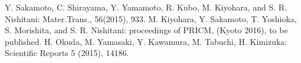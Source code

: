 \documentclass[a4j,twocolumn]{jsarticle}
\begin{document}
\begin{thebibliography}{9}
Y. Sakamoto, C. Shirayama, Y. Yamamoto, R. Kubo, M. Kiyohara, and S. R. Nishitani: Mater.Trans., 56(2015), 933.
 M. Kiyohara, Y. Sakamoto, T. Yoshioka, S. Morishita, and S. R. Nishitani: proceedings of PRICM, (Kyoto 2016), to be published.
 H. Okuda, M. Yamasaki, Y. Kawamura, M. Tabuchi, H. Kimizuka: Scientific Reports 5 (2015), 14186.
\end{thebibliography}
\end{document}

